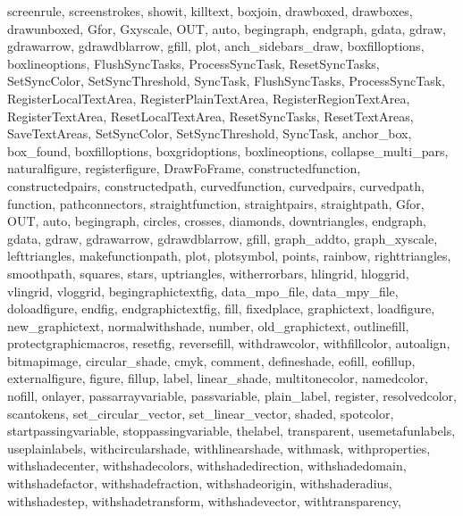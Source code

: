 {{        screenrule, screenstrokes, showit, killtext,%
        boxjoin, drawboxed, drawboxes, drawunboxed,%
        Gfor, Gxyscale, OUT, auto, begingraph, endgraph, gdata,%
        gdraw, gdrawarrow, gdrawdblarrow, gfill, plot,%
        anch_sidebars_draw, boxfilloptions, boxlineoptions,%
        FlushSyncTasks, ProcessSyncTask, ResetSyncTasks,%
        SetSyncColor, SetSyncThreshold, SyncTask,%
        FlushSyncTasks, ProcessSyncTask,%
        RegisterLocalTextArea, RegisterPlainTextArea,%
        RegisterRegionTextArea, RegisterTextArea,%
        ResetLocalTextArea, ResetSyncTasks, ResetTextAreas,%
        SaveTextAreas, SetSyncColor, SetSyncThreshold,%
        SyncTask, anchor_box, box_found, boxfilloptions,%
        boxgridoptions, boxlineoptions, collapse_multi_pars,%
        naturalfigure, registerfigure, DrawFoFrame,%
        constructedfunction, constructedpairs,%
        constructedpath, curvedfunction, curvedpairs,%
        curvedpath, function, pathconnectors, straightfunction,%
        straightpairs, straightpath,%
        Gfor, OUT, auto, begingraph, circles, crosses, diamonds,%
        downtriangles, endgraph, gdata, gdraw, gdrawarrow,%
        gdrawdblarrow, gfill, graph_addto,%
        graph_xyscale, lefttriangles, makefunctionpath, plot,%
        plotsymbol, points, rainbow, righttriangles, smoothpath,%
        squares, stars, uptriangles, witherrorbars,%
        hlingrid, hloggrid, vlingrid, vloggrid,%
        begingraphictextfig, data_mpo_file,%
        data_mpy_file, doloadfigure, endfig,%
        endgraphictextfig, fill, fixedplace, graphictext,%
        loadfigure, new_graphictext, normalwithshade, number,%
        old_graphictext, outlinefill, protectgraphicmacros,%
        resetfig, reversefill, withdrawcolor, withfillcolor,%
        autoalign, bitmapimage, circular_shade, cmyk, comment,%
        defineshade, eofill, eofillup, externalfigure, figure,%
        fillup, label, linear_shade, multitonecolor, namedcolor,%
        nofill, onlayer, passarrayvariable, passvariable,%
        plain_label, register, resolvedcolor, scantokens,%
        set_circular_vector, set_linear_vector, shaded,%
        spotcolor, startpassingvariable, stoppassingvariable,%
        thelabel, transparent, usemetafunlabels,%
        useplainlabels, withcircularshade, withlinearshade,%
        withmask, withproperties, withshadecenter,%
        withshadecolors, withshadedirection, withshadedomain,%
        withshadefactor, withshadefraction, withshadeorigin,%
        withshaderadius, withshadestep, withshadetransform,%
        withshadevector, withtransparency,%
}}
